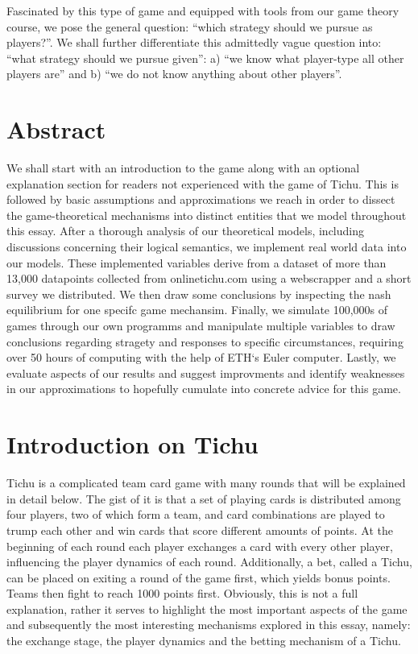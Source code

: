     Fascinated by this type of game and equipped with tools from our game theory course, we pose the general question: “which strategy should we pursue as players?”. We shall further differentiate this admittedly vague question into: “what strategy should we pursue given”: a) “we know what player-type all other players are” and b) “we do not know anything about other players”. 
    
\section*{Abstract}
We shall start with an introduction to the game along with an optional explanation section for readers not experienced with the game of Tichu. This is followed by basic assumptions and approximations we reach in order to dissect the game-theoretical mechanisms into distinct entities that we model throughout this essay. After a thorough analysis of our theoretical models, including discussions concerning their logical semantics, we implement real world data into our models. These implemented variables derive from a dataset of more than 13,000 datapoints collected from onlinetichu.com using a webscrapper and a short survey we distributed. We then draw some conclusions by inspecting the nash equilibrium for one specifc game mechansim. Finally, we simulate 100,000s of games through our own programms and manipulate multiple variables to draw conclusions regarding stragety and responses to specific circumstances, requiring over 50 hours of computing with the help of ETH‘s Euler computer. Lastly, we evaluate aspects of our results and suggest improvments and identify weaknesses in our approximations to hopefully cumulate into concrete advice for this game.

\section{Introduction on Tichu}

Tichu is a complicated team card game with many rounds that will be explained in detail below. The gist of it is that a set of playing cards is distributed among four players, two of which form a team, and card combinations are played to trump each other and win cards that score different amounts of points. At the beginning of each round each player exchanges a card with every other player, influencing the player dynamics of each round. Additionally, a bet, called a Tichu, can be placed on exiting a round of the game first, which yields bonus points. Teams then fight to reach 1000 points first. Obviously, this is not a full explanation, rather it serves to highlight the most important aspects of the game and subsequently the most interesting mechanisms explored in this essay, namely: the exchange stage, the player dynamics and the betting mechanism of a Tichu. 

